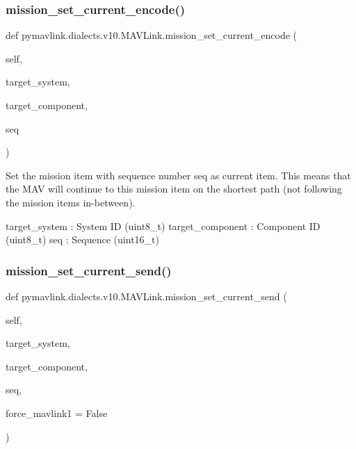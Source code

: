 \begin{DoxyVerb}
\begin{DoxyVerb}
\begin{DoxyVerb}
\begin{DoxyVerb}
\subsubsection{\texorpdfstring{mission\+\_\+set\+\_\+current\+\_\+encode()}{mission\_set\_current\_encode()}}
{\footnotesize\ttfamily def pymavlink.\+dialects.\+v10.\+M\+A\+V\+Link.\+mission\+\_\+set\+\_\+current\+\_\+encode (\begin{DoxyParamCaption}\item[{}]{self,  }\item[{}]{target\+\_\+system,  }\item[{}]{target\+\_\+component,  }\item[{}]{seq }\end{DoxyParamCaption})}

\begin{DoxyVerb}Set the mission item with sequence number seq as current item. This
means that the MAV will continue to this mission item
on the shortest path (not following the mission items
in-between).

target_system             : System ID (uint8_t)
target_component          : Component ID (uint8_t)
seq                       : Sequence (uint16_t)\end{DoxyVerb}
 \mbox{\label{classpymavlink_1_1dialects_1_1v10_1_1MAVLink_a45a01e196f1b2a1d9d10b2ae33b4e104}} 
\subsubsection{\texorpdfstring{mission\+\_\+set\+\_\+current\+\_\+send()}{mission\_set\_current\_send()}}
{\footnotesize\ttfamily def pymavlink.\+dialects.\+v10.\+M\+A\+V\+Link.\+mission\+\_\+set\+\_\+current\+\_\+send (\begin{DoxyParamCaption}\item[{}]{self,  }\item[{}]{target\+\_\+system,  }\item[{}]{target\+\_\+component,  }\item[{}]{seq,  }\item[{}]{force\+\_\+mavlink1 = {\ttfamily False} }\end{DoxyParamCaption})}


\end{DoxyVerb}
\end{DoxyVerb}
\end{DoxyVerb}
\end{DoxyVerb}
